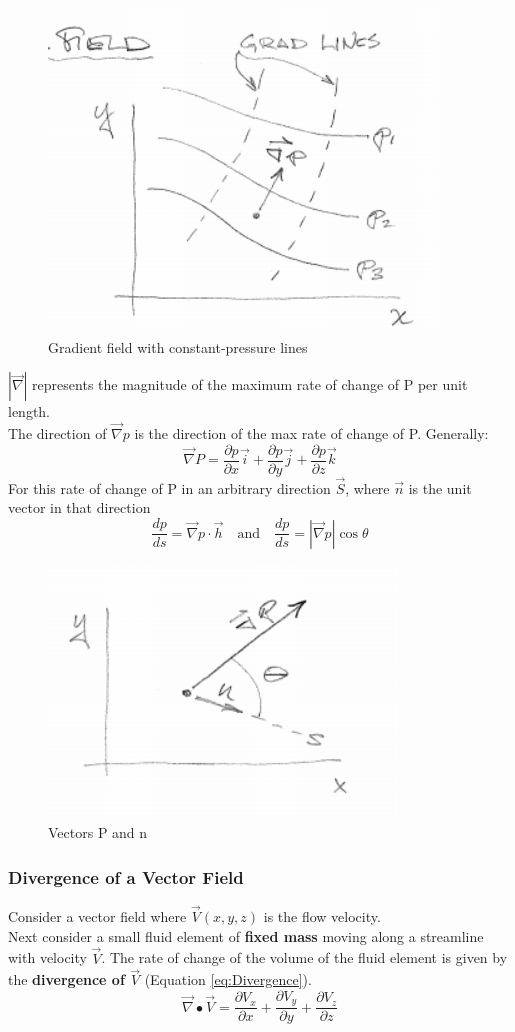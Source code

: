 \documentclass[draft=false, titlepage]{article}
\newcommand{\gradient}{\vec{\nabla}}
\begin{document}
\begin{figure}[ht]
    \centering
    \includegraphics[width=0.3\linewidth]{Figures/gradient_field.PNG}
    \caption{Gradient field with constant-pressure lines}
    \label{fig:gradient_field}
\end{figure}

$|\vec{\nabla}|$ represents the magnitude of the maximum rate of change of P per unit length.\\
The direction of $\vec{\nabla}p$ is the direction of the max rate of change of P. Generally:
\begin{equation}
    \gradient P = \frac{\partial p}{\partial x}\vec{i} + \frac{\partial p}{\partial y}\vec{j} + \frac{\partial p}{\partial z}\vec{k}
\end{equation}
For this rate of change of P in an arbitrary direction $\vec{S}$, where $\vec{n}$ is the unit vector in that direction
\begin{equation}
    \frac{dp}{ds} = \gradient p \cdot \vec{h} \quad \text{and} \quad \frac{dp}{ds} = |\gradient p| \cos\theta
\end{equation}

\begin{figure}[ht]
    \centering
    \includegraphics[width=0.25\linewidth]{Figures/gradient_2.PNG}
    \caption{Vectors P and n}
    \label{fig:gradient_2}
\end{figure}

\subsubsection{Divergence of a Vector Field}
Consider a vector field where $\vec{V}(x, y, z)$ is the flow velocity.\\
Next consider a small fluid element of \textbf{fixed mass} moving along a streamline with velocity $\vec{V}$. The rate of change of the volume of the fluid element is given by the \textbf{divergence of $\vec{V}$} (Equation \ref{eq:Divergence}).
\begin{equation}
    \gradient \bullet \vec{V} = \frac{\partial V_x}{\partial x} + \frac{\partial V_y}{\partial y} + \frac{\partial V_z}{\partial z}
    \label{eq:Divergence}
\end{equation}
\end{document}
